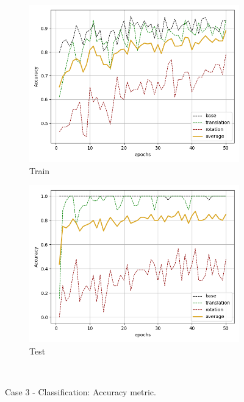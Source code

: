 \begin{figure}[H]
    \begin{subfigure}{.48\linewidth}
    \centering
    \includegraphics[scale=0.45]{Img/cls_flow_nonoise_train_acc.png}
    \caption{Train}
    \end{subfigure}
    \begin{subfigure}{.48\linewidth}
    \centering
    \includegraphics[scale=0.45]{Img/cls_flow_nonoise_test_acc.png}
    \caption{Test}
    \end{subfigure}\\
    \caption{Case 3 - Classification: Accuracy metric. }
\end{figure}
